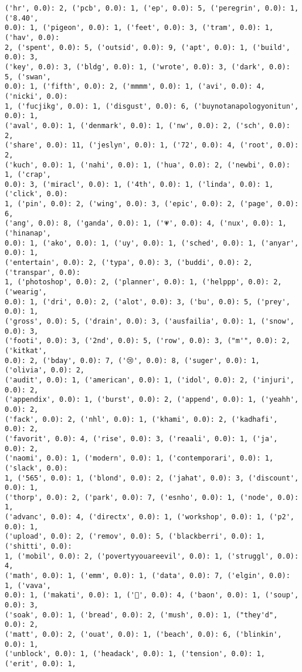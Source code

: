 \documentclass[11pt]{article}
\begin{document}
\begin{Verbatim}[commandchars=\\\{\}]
('hr', 0.0): 2, ('pcb', 0.0): 1, ('ep', 0.0): 5, ('peregrin', 0.0): 1, ('8.40',
0.0): 1, ('pigeon', 0.0): 1, ('feet', 0.0): 3, ('tram', 0.0): 1, ('hav', 0.0):
2, ('spent', 0.0): 5, ('outsid', 0.0): 9, ('apt', 0.0): 1, ('build', 0.0): 3,
('key', 0.0): 3, ('bldg', 0.0): 1, ('wrote', 0.0): 3, ('dark', 0.0): 5, ('swan',
0.0): 1, ('fifth', 0.0): 2, ('mmmm', 0.0): 1, ('avi', 0.0): 4, ('nicki', 0.0):
1, ('fucjikg', 0.0): 1, ('disgust', 0.0): 6, ('buynotanapologyonitun', 0.0): 1,
('aval', 0.0): 1, ('denmark', 0.0): 1, ('nw', 0.0): 2, ('sch', 0.0): 2,
('share', 0.0): 11, ('jeslyn', 0.0): 1, ('72', 0.0): 4, ('root', 0.0): 2,
('kuch', 0.0): 1, ('nahi', 0.0): 1, ('hua', 0.0): 2, ('newbi', 0.0): 1, ('crap',
0.0): 3, ('miracl', 0.0): 1, ('4th', 0.0): 1, ('linda', 0.0): 1, ('click', 0.0):
1, ('pin', 0.0): 2, ('wing', 0.0): 3, ('epic', 0.0): 2, ('page', 0.0): 6,
('ang', 0.0): 8, ('ganda', 0.0): 1, ('💗', 0.0): 4, ('nux', 0.0): 1, ('hinanap',
0.0): 1, ('ako', 0.0): 1, ('uy', 0.0): 1, ('sched', 0.0): 1, ('anyar', 0.0): 1,
('entertain', 0.0): 2, ('typa', 0.0): 3, ('buddi', 0.0): 2, ('transpar', 0.0):
1, ('photoshop', 0.0): 2, ('planner', 0.0): 1, ('helppp', 0.0): 2, ('wearig',
0.0): 1, ('dri', 0.0): 2, ('alot', 0.0): 3, ('bu', 0.0): 5, ('prey', 0.0): 1,
('gross', 0.0): 5, ('drain', 0.0): 3, ('ausfailia', 0.0): 1, ('snow', 0.0): 3,
('footi', 0.0): 3, ('2nd', 0.0): 5, ('row', 0.0): 3, ("m'", 0.0): 2, ('kitkat',
0.0): 2, ('bday', 0.0): 7, ('😢', 0.0): 8, ('suger', 0.0): 1, ('olivia', 0.0): 2,
('audit', 0.0): 1, ('american', 0.0): 1, ('idol', 0.0): 2, ('injuri', 0.0): 2,
('appendix', 0.0): 1, ('burst', 0.0): 2, ('append', 0.0): 1, ('yeahh', 0.0): 2,
('fack', 0.0): 2, ('nhl', 0.0): 1, ('khami', 0.0): 2, ('kadhafi', 0.0): 2,
('favorit', 0.0): 4, ('rise', 0.0): 3, ('reaali', 0.0): 1, ('ja', 0.0): 2,
('naomi', 0.0): 1, ('modern', 0.0): 1, ('contemporari', 0.0): 1, ('slack', 0.0):
1, ('565', 0.0): 1, ('blond', 0.0): 2, ('jahat', 0.0): 3, ('discount', 0.0): 1,
('thorp', 0.0): 2, ('park', 0.0): 7, ('esnho', 0.0): 1, ('node', 0.0): 1,
('advanc', 0.0): 4, ('directx', 0.0): 1, ('workshop', 0.0): 1, ('p2', 0.0): 1,
('upload', 0.0): 2, ('remov', 0.0): 5, ('blackberri', 0.0): 1, ('shitti', 0.0):
1, ('mobil', 0.0): 2, ('povertyyouareevil', 0.0): 1, ('struggl', 0.0): 4,
('math', 0.0): 1, ('emm', 0.0): 1, ('data', 0.0): 7, ('elgin', 0.0): 1, ('vava',
0.0): 1, ('makati', 0.0): 1, ('💛', 0.0): 4, ('baon', 0.0): 1, ('soup', 0.0): 3,
('soak', 0.0): 1, ('bread', 0.0): 2, ('mush', 0.0): 1, ("they'd", 0.0): 2,
('matt', 0.0): 2, ('ouat', 0.0): 1, ('beach', 0.0): 6, ('blinkin', 0.0): 1,
('unblock', 0.0): 1, ('headack', 0.0): 1, ('tension', 0.0): 1, ('erit', 0.0): 1,

\end{Verbatim}
\end{document}

